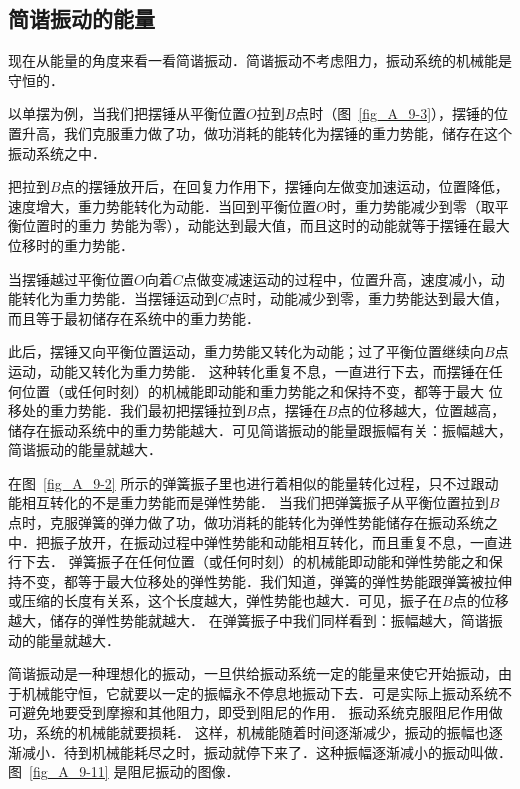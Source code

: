 \subsection{简谐振动的能量}

现在从能量的角度来看一看简谐振动．简谐振动不考虑阻力，振动系统的机械能是守恒的．

以单摆为例，当我们把摆锤从平衡位置$O$拉到$B$点时（图~\ref{fig_A_9-3}），摆锤的位置升高，我们克服重力做了功，做功消耗的能转化为摆锤的重力势能，储存在这个振动系统之中．

把拉到$B$点的摆锤放开后，在回复力作用下，摆锤向左做变加速运动，位置降低，速度增大，重力势能转化为动能．当回到平衡位置$O$时，重力势能减少到零（取平衡位置时的重力
势能为零），动能达到最大值，而且这时的动能就等于摆锤在最大位移时的重力势能．

当摆锤越过平衡位置$O$向着$C$点做变减速运动的过程中，位置升高，速度减小，动能转化为重力势能．当摆锤运动到$C$点时，动能减少到零，重力势能达到最大值，而且等于最初储存在系统中的重力势能．

此后，摆锤又向平衡位置运动，重力势能又转化为动能；过了平衡位置继续向$B$点运动，动能又转化为重力势能．
这种转化重复不息，一直进行下去，而摆锤在任何位置（或任何时刻）的机械能即动能和重力势能之和保持不变，都等于最大
位移处的重力势能．我们最初把摆锤拉到$B$点，摆锤在$B$点的位移越大，位置越高，储存在振动系统中的重力势能越大．可见简谐振动的能量跟振幅有关：振幅越大，简谐振动的能量就越大．

在图~\ref{fig_A_9-2} 所示的弹簧振子里也进行着相似的能量转化过程，只不过跟动能相互转化的不是重力势能而是弹性势能．
当我们把弹簧振子从平衡位置拉到$B$点时，克服弹簧的弹力做了功，做功消耗的能转化为弹性势能储存在振动系统之中．把振子放开，在振动过程中弹性势能和动能相互转化，而且重复不息，一直进行下去．
弹簧振子在任何位置（或任何时刻）的机械能即动能和弹性势能之和保持不变，都等于最大位移处的弹性势能．我们知道，弹簧的弹性势能跟弹簧被拉伸或压缩的长度有关系，这个长度越大，弹性势能也越大．可见，振子在$B$点的位移越大，储存的弹性势能就越大．
在弹簧振子中我们同样看到：振幅越大，简谐振动的能量就越大．

简谐振动是一种理想化的振动，一旦供给振动系统一定的能量来使它开始振动，由于机械能守恒，它就要以一定的振幅永不停息地振动下去．可是实际上振动系统不可避免地要受到摩擦和其他阻力，即受到阻尼的作用．
振动系统克服阻尼作用做功，系统的机械能就要损耗．
这样，机械能随着时间逐渐减少，振动的振幅也逐渐减小．待到机械能耗尽之时，振动就停下来了．这种振幅逐渐减小的振动叫做．图~\ref{fig_A_9-11} 是阻尼振动的图像．

